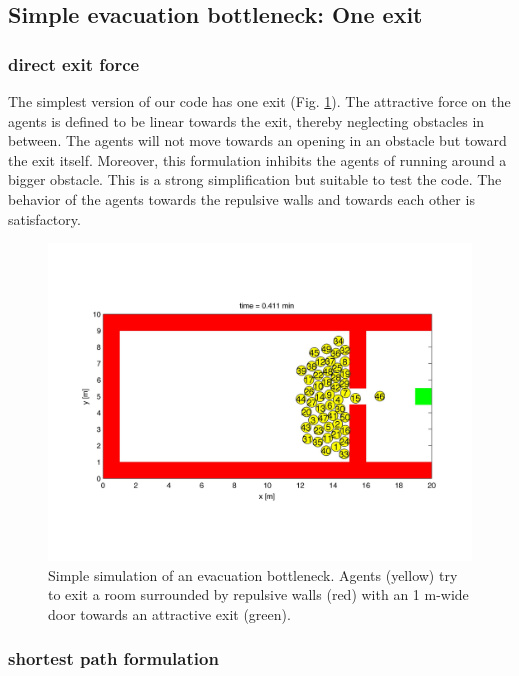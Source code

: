 \documentclass[11pt]{article}
\begin{document}
\subsection{Simple evacuation bottleneck: One exit}
\subsubsection{direct exit force}

The simplest version of our code has one exit (Fig. \ref{fig:test1}). The attractive force on the agents is defined to be linear towards the exit, thereby neglecting obstacles in between. The agents will not move towards an opening in an obstacle but toward the exit itself. Moreover, this formulation inhibits the agents of running around a bigger obstacle. This is a strong simplification but suitable to test the code.
The behavior of the agents towards the repulsive walls and towards each other is satisfactory.

\begin{figure}
	\begin{center}
	\includegraphics[width=16cm]{figures/test1000493.jpg}
	\caption{Simple simulation of an evacuation bottleneck. Agents (yellow) try to exit a room surrounded by repulsive walls (red) with an 1 m-wide door towards an attractive exit (green).}
	\label{fig:test1}
	\end{center}
\end{figure}

\subsubsection{shortest path formulation}
\end{document}

